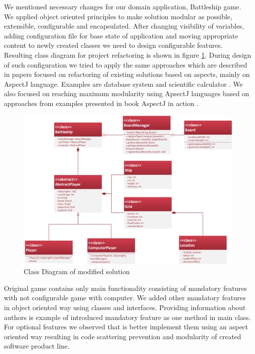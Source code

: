 \documentclass[11pt,english,a4paper,twoside]{article}
\begin{document}
We mentioned necessary changes for our domain application, Battleship game. We applied object oriented principles to make solution modular as possible, extensible, configurable and encapsulated. After changing visibility of variables, adding configuration file for base state of application and moving appropriate content to newly created classes we need to design configurable features. Resulting class diagram for project refactoring is shown in figure \ref{refactoredSchema}. During design of such configuration we tried to apply the same approaches which are described in papers focused on refactoring of existing solutions based on aspects, mainly on AspectJ language. Examples are database system \cite{kastner_case_2007} and scientific calculator \cite{botterweck_automating_2009}. We also focused on reaching maximum modularity using ApsectJ languages based on approaches from examples presented in book AspectJ in action \cite{laddad_aspectj_2003}.


\begin{figure}[t]  %
					\begin{center}
									\includegraphics[width=\linewidth]{fig/refactoredSchema.png}
									\caption{Class Diagram of modified solution}
									\label{refactoredSchema}
					\end{center}
\end{figure}

Original game contains only main functionality consisting of mandatory features with not configurable game with computer. We added other mandatory features in object oriented way using classes and interfaces. Providing information about authors is example of introduced mandatory feature as one method in main class. For optional features we observed that is better implement them using an aspect oriented way resulting in code scattering prevention and modularity of created software product line. 
\end{document}
